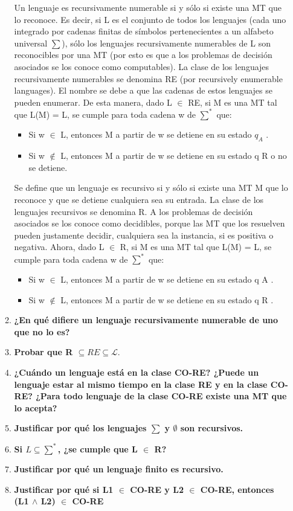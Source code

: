 \documentclass{article}
\begin{document}
\begin{enumerate}
\begin{enumerate}
Un lenguaje es recursivamente numerable si y sólo si existe una MT que lo reconoce.
Es decir, si L es el conjunto de todos los lenguajes (cada uno integrado por cadenas
finitas de símbolos pertenecientes a un alfabeto universal $\sum$), sólo los lenguajes
recursivamente numerables de L son reconocibles por una MT (por esto es que a los
problemas de decisión asociados se los conoce como computables). La clase de los
lenguajes recursivamente numerables se denomina RE (por recursively enumerable
languages). El nombre se debe a que las cadenas de estos lenguajes se pueden
enumerar. De esta manera, dado L $\in$ RE, si M es una MT tal que L(M) = L, se cumple
para toda cadena w de $\sum^*$ que:
\begin{itemize}
\item Si w $\in$ L, entonces M a partir de w se detiene en su estado $q_A$ .
\item Si w $\notin$ L, entonces M a partir de w se detiene en su estado q R o no se detiene.
\end{itemize}
Se define que un lenguaje es recursivo si y sólo si existe una MT M que lo reconoce y que se detiene cualquiera sea su entrada. La clase
de los lenguajes recursivos se denomina R. A los problemas de decisión asociados se los
conoce como decidibles, porque las MT que los resuelven pueden justamente decidir,
cualquiera sea la instancia, si es positiva o negativa. Ahora, dado L $\in$ R, si M es una
MT tal que L(M) = L, se cumple para toda cadena w de $\sum^*$ que:
\begin{itemize}
\item Si w $\in$ L, entonces M a partir de w se detiene en su estado q A .
\item Si w $\notin$ L, entonces M a partir de w se detiene en su estado q R .
\end{itemize}
\item \textbf{¿En qué difiere un lenguaje recursivamente numerable de uno que no lo es?}
\item \textbf{Probar que R $\subseteq RE \subseteq \mathcal{L}.$}
\item \textbf{¿Cuándo un lenguaje está en la clase CO-RE? ¿Puede un lenguaje estar al mismo tiempo en la clase RE y en la clase CO-RE? ¿Para todo lenguaje de la clase CO-RE existe una MT que lo acepta?}
\item \textbf{Justificar por qué los lenguajes $\sum$ y $\emptyset$ son recursivos.}
\item \textbf{Si $L \subseteq \sum^*$, ¿se cumple que L $\in$ R?}
\item \textbf{Justificar por qué un lenguaje finito es recursivo.}
\item \textbf{Justificar por qué si L1 $\in$ CO-RE y L2 $\in$ CO-RE, entonces (L1 $\wedge$ L2) $\in$ CO-RE}
\end{enumerate}


\end{enumerate}
\end{document}
